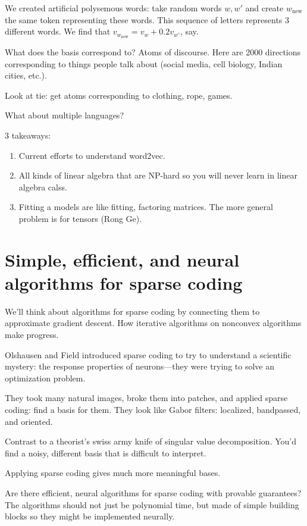 We created artificial polysemous words: take random words $w,w'$ and create $w_{\text{new}}$ the same token representing these words. This sequence of letters represents 3 different words. 
We find that $v_{w_{\text{new}}}=v_w+0.2v_{w'}$, say. 

What does the basis correspond to? Atoms of discourse. Here are 2000 directions corresponding to things people talk about (social media, cell biology, Indian cities, etc.). 

Look at tie: get atoms corresponding to clothing, rope, games.

What about multiple languages?

3 takeaways:
\begin{enumerate}
\item
Current efforts to understand word2vec. 
\item
All kinds of linear algebra that are NP-hard so you will never learn in linear algebra calss.
\item
Fitting a models are like fitting, factoring matrices. The more general problem is for tensors (Rong Ge).
\end{enumerate}

\section{Simple, efficient, and neural algorithms for sparse coding}

We'll think about algorithms for sparse coding by connecting them to approximate gradient descent. How iterative algorithms on nonconvex algorithms make progress.

Olshausen and Field introduced sparse coding to try to understand a scientific mystery: the response properties of neurons---they were trying to solve an optimization problem.

They took many natural images, broke them into patches, and applied sparse coding: find a basis for them. They look like Gabor filters: localized, bandpassed, and oriented. 

Contrast to a theorist's swiss army knife of singular value decomposition. You'd find a noisy, different basis that is difficult to interpret. 

Applying sparse coding gives much more meaningful bases. 

Are there efficient, neural algorithms for sparse coding with provable guarantees? The algorithms should not just be polynomial time, but made of simple building blocks so they might be implemented neurally.

